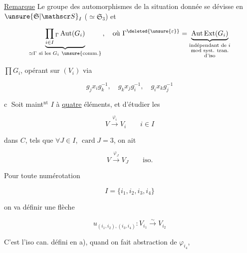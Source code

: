 
 \uline{Remarque} Le groupe des automorphismes de la situation donnée se dévisse en $\unsure{\mathfrak S|\mathscr S}_I$ ($\simeq\mathfrak S_3$)  et

\[
\underset{\simeq\Gamma\ \text{si les }G_i\ \text{\unsure{comm.}}}{\underbrace{\prod_{i\in I}{}_{\Gamma}\operatorname{Aut}(G_{i})}}\,,
\quad\text{où }\Gamma^{\deleted{\unsure{\varepsilon}}}=
 \underbrace{\operatorname{Aut}\operatorname{Ext}(G_i)}_{\substack{\text{indépendant de }i\\\text{mod syst. tran.}\\\text{d'iso}}}
\]

$\prod G_i$, opérant sur $(V_i)$ via

\[
g_jx_i g_k^{-1},\quad g_kx_jg_i^{-1},\quad g_ix_kg_j^{-1}
\]



\textcircled{c} Soit maint$^{\mathrm{nt}}$ $I$  à \uline{quatre} éléments, et     d'étudier les

\[
 V\xrightarrow{\varphi_i}V_i\qquad i\in I
\]

dans $C$, tels que $\forall J\in I$, $\operatorname{card} J=3$, on ait

\[
V\xrightarrow{\varphi_J}V_J\qquad\text{iso.}
\]

Pour toute  numérotation

\[
 I=\{i_1,i_2,i_3,i_4\}
\]

on va définir une flèche

\[
 u_{(i_1,i_2),(i_3,i_4)}:V_{i_1}\xrightarrow{\sim}V_{i_2}
 \tag*{(1)}
\]


C'est l'iso can. défini en a), quand on fait abstraction de $\varphi_{i_4}$, 

